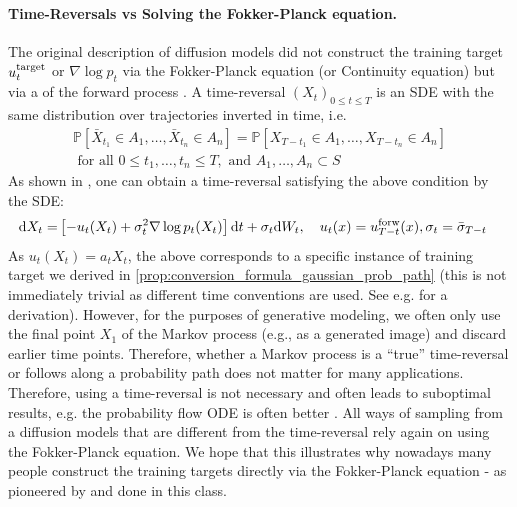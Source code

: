 \paragraph{Time-Reversals vs Solving the Fokker-Planck equation.}

The original description of diffusion models did not construct the training target $u^{\text{target}}_t$ or $\nabla\log p_t$ via the Fokker-Planck equation (or Continuity equation) but via a  of the forward process \citep{anderson1982reverse}. A time-reversal $(X_t)_{0\leq t\leq T}$ is an SDE with the same distribution over trajectories inverted in time, i.e.
\begin{align}
\mathbb{P}[\bar{X}_{t_1}\in A_1,\dots,\bar{X}_{t_n}\in A_n]=\mathbb{P}[X_{T-t_1}\in A_1,\dots,X_{T-t_n}\in A_n]\\
    \text{ for all }0\leq t_1,\dots, t_n\leq T, \text{ and } A_1,\dots,A_n\subset S
\end{align}
As shown in \citet{anderson1982reverse}, one can obtain a time-reversal satisfying the above condition by the SDE:
\begin{align*}
    \mathrm{d} X_t =& \left[-u_t(X_t)+\sigma_t^2\nabla\log p_t(X_t)\right]\mathrm{d} t+ \sigma_{t}\mathrm{d} W_t,\quad u_t(x)=u^{\text{forw}}_{T-t}(x),\sigma_t=\bar{\sigma}_{T-t}
\end{align*}
As $u_t(X_t)=a_tX_t$, the above corresponds to a specific instance of training target we derived in \cref{prop:conversion_formula_gaussian_prob_path} (this is not immediately trivial as different time conventions are used. See e.g. \citep{lipman2024flow} for a derivation). However, for the purposes of generative modeling, we often only use the final point $X_1$ of the Markov process (e.g., as a generated image) and discard earlier time points. Therefore, whether a Markov process is a ``true'' time-reversal or follows along a probability path does not matter for many applications. Therefore, using a time-reversal is not necessary and often leads to suboptimal results, e.g. the probability flow ODE is often better \citep{karras2022elucidating, ma2024sit}. All ways of sampling from a diffusion models that are different from the time-reversal rely again on using the Fokker-Planck equation. We hope that this illustrates why nowadays many people construct the training targets directly via the Fokker-Planck equation - as pioneered by \citep{lipman2022flow,liu2022flow,albergo2023stochastic} and done in this class.

